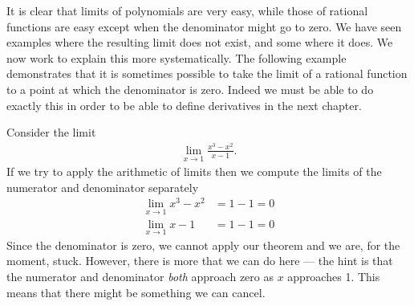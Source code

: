 It is clear that limits of polynomials are very easy, while those of rational
functions are easy except when the denominator might go to zero. We have seen
examples where the resulting limit does not exist, and some where it does. We
now work to explain this more systematically. The following example demonstrates that it
is sometimes possible to take the limit of a rational function to a point at which the
denominator is zero. Indeed we must be able to do exactly this in order to be able to
define derivatives in
the next chapter.
\begin{eg}\label{eg zero cancel limit}
Consider the limit
\begin{align*}
    \lim_{x \to 1} \frac{x^3-x^2}{x-1}.
\end{align*}
If we try to apply the arithmetic of limits then we compute the limits of the
numerator and denominator separately
\begin{align}
    \lim_{x \to 1} x^3-x^2 &= 1-1 = 0 \\
    \lim_{x \to 1} x-1 &= 1-1 = 0
\end{align}
Since the denominator is zero, we cannot apply our theorem and we are, for the
moment, stuck. However, there is more that we can do here --- the hint is that
the numerator and denominator \emph{both} approach zero as $x$ approaches 1. This
means that there might be something we can cancel.


\end{eg}
